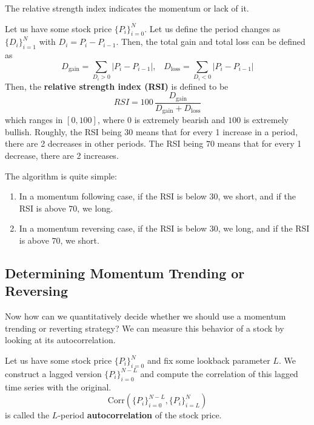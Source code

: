 \documentclass{article}
\begin{document}
    The relative strength index indicates the momentum or lack of it. 

    \begin{definition}
      \label{def:relative-strength-index}
      Let us have some stock price $\{P_i\}_{i=0}^N$. Let us define the period changes as $\{D_i\}_{i=1}^N$ with $D_i = P_i - P_{i-1}$. Then, the total gain and total loss can be defined as 
      \begin{equation}
        D_\mathrm{gain} = \sum_{D_i > 0} |P_i - P_{i-1}|, \;\;\; D_{\mathrm{loss}} = \sum_{D_i < 0} |P_i - P_{i-1}|
      \end{equation}
      Then, the \textbf{relative strength index (RSI)} is defined to be 
      \begin{equation}
        RSI = 100 \, \frac{D_{\mathrm{gain}}}{D_\mathrm{gain} + D_{\mathrm{loss}}}
      \end{equation}
      which ranges in $[0, 100]$, where $0$ is extremely bearish and $100$ is extremely bullish. Roughly, the RSI being $30$ means that for every 1 increase in a period, there are 2 decreases in other periods. The RSI being $70$ means that for every 1 decrease, there are 2 increases. 
    \end{definition}

    The algorithm is quite simple: 
    \begin{enumerate}
      \item In a momentum following case, if the RSI is below $30$, we short, and if the RSI is above $70$, we long. 
      \item In a momentum reversing case, if the RSI is below $30$, we long, and if the RSI is above $70$, we short. 
    \end{enumerate}

  \subsection{Determining Momentum Trending or Reversing}

    Now how can we quantitatively decide whether we should use a momentum trending or reverting strategy? We can measure this behavior of a stock by looking at its autocorrelation. 

    \begin{definition}[Autocorrelation]
      \label{def:autocorrelation}
      Let us have some stock price $\{P_i\}_{i=0}^N$ and fix some lookback parameter $L$. We construct a lagged version $\{P_i\}_{i=0}^{N-L}$ and compute the correlation of this lagged time series with the original. 
      \begin{equation}
        \mathrm{Corr}(\{P_i\}_{i=0}^{N-L}, \{P_i\}_{i = L}^{N})
      \end{equation}
      is called the $L$-period \textbf{autocorrelation} of the stock price. 
    \end{definition}
\end{document}
